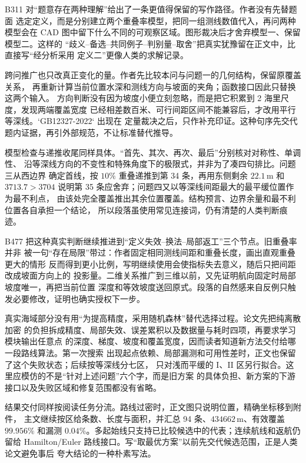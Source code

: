\documentclass[UTF8,a4paper,12pt]{ctexart}
\begin{document}
B311 对“题意存在两种理解”给出了一条更值得保留的写作路径。作者没有先替题面
选定定义，而是分别建立两个重叠率模型，把同一组测线数值代入，再问两种模型会在
CAD 图中留下什么不同的可观察区域。图形裁决后才舍弃模型一、保留模型二。这样的
“歧义--备选--共同例子--判别量--取舍”把真实犹豫留在正文中，比直接写“经分析采用
定义二”更像人类的求解记录。

跨问推广也只改真正变化的量。作者先比较本问与问题一的几何结构，保留原覆盖关系，
再重新计算当前位置水深和测线方向与坡面的夹角；函数接口因此只替换这两个输入。
方向判断没有因为坡度小便立刻忽略，而是把它积累到 2 海里尺度，发现两端覆盖宽度
已经相差数百米、可行间距区间不能兼容后，才改用平行等深线。`GB12327-2022` 出现在
定量裁决之后，只作补充印证。这种句序先交代题内证据，再引外部规范，不让标准替代推导。

模型检查与递推收尾同样具体。“首先、其次、再次、最后”分别核对对称性、单调性、
沿等深线方向的不变性和特殊角度下的极限式，并非为了凑四句排比。问题三从西边界
确定首线，按 $10\%$ 重叠递推到第 34 条，再用东侧剩余 $22.1\,\mathrm{m}$ 和
$3713.7>3704$ 说明第 35 条应舍弃；问题四又以等深线间距最大的最平缓位置作为最不利点，
由该处完全覆盖推出其余位置覆盖。结构预言、边界余量和最不利位置各自承担一个结论，
所以段落虽使用常见连接词，仍有清楚的人类判断痕迹。

B477 把这种真实判断继续推进到“定义失效--换法--局部返工”三个节点。旧重叠率并非
被一句“存在局限”带过：作者固定相同测线间距和重叠长度，画出直观重叠更大的情形
反而得到更小比例，写明继续使用会使指标失去意义，随后只把间距改成坡面方向上的
投影量。二维关系推广到三维以前，又先证明航向固定时局部坡度唯一，再把当前位置
深度和等效坡度送回原式。段落的自然感来自反例只触发必要修改，证明也确实授权下一步。

真实海域部分没有用“为提高精度，采用随机森林”替代选择过程。论文先把纯离散加密
的负担拆成精度、局部失效、误差累积以及数据量与耗时四项，再要求学习模块输出任意点
的深度、梯度、坡度和覆盖宽度，因而读者知道新方法交付给哪一段路线算法。第一次搜索
出现起点依赖、局部漏测和可用性差时，正文也保留了这个失败状态；后续按等深线分七区，
只对浅而平缓的 I、II 区另行拟合。这里应模仿的不是“针对上述问题”六个字，而是旧方案
的具体负担、新方案的下游接口以及失败区域和修复范围都没有省略。

结果交付同样按阅读任务分流。路线过密时，正文图只说明位置，精确坐标移到附件，
主文继续按区给条数、长度与面积，并汇总 94 条、$434662\,\mathrm{m}$、有效覆盖
$99.956\%$ 和漏测 $0.04\%$。多起始线只支持已比较候选中的代表；连续航线和返航仍留给
Hamilton/Euler 路线接口。写“取最优方案”以前先交代候选范围，正是人类论文避免事后
夸大结论的一种朴素写法。
\end{document}
